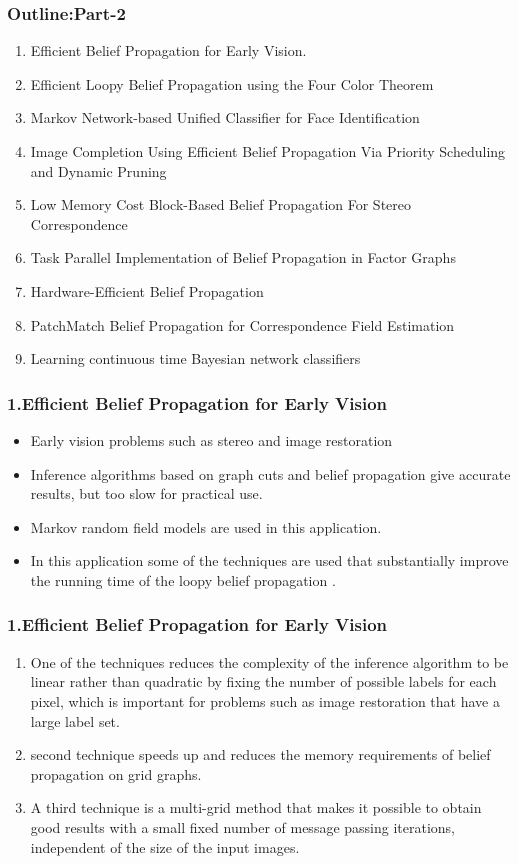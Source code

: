 \documentclass{beamer}
\begin{document}
\begin{frame}
\frametitle{\textbf{Outline:Part-2}}
\begin{enumerate}
\item Efficient Belief Propagation for Early Vision.
\item Efficient Loopy Belief Propagation using the Four Color Theorem
\item Markov Network-based Unified Classifier for Face Identification
\item Image Completion Using Efficient Belief Propagation Via Priority Scheduling and Dynamic Pruning
\item Low Memory Cost Block-Based Belief Propagation For Stereo Correspondence
\item Task Parallel Implementation of Belief Propagation in Factor Graphs
\item Hardware-Efficient Belief Propagation
\item PatchMatch Belief Propagation for Correspondence Field Estimation
\item Learning continuous time Bayesian network classifiers
\end{enumerate}
\end{frame}



\begin{frame}
\frametitle{\textbf{1.Efficient Belief Propagation for Early Vision}}
\begin{itemize}
\item Early vision problems such as stereo and image restoration
\item Inference algorithms based on graph cuts and belief propagation give accurate results, but  too slow for practical use.
\item Markov random field models are used in this application.
\item In this application  some of the techniques  are used that substantially improve the running time of the loopy belief propagation .

\end{itemize}
\end{frame}

\begin{frame}
\frametitle{\textbf{1.Efficient Belief Propagation for Early Vision}}

\begin{enumerate}
  \item One of the techniques reduces the complexity of the inference algorithm to be linear rather than quadratic by fixing the number of possible labels for each pixel, which is important for problems such as image restoration that have a large label set.
  \item second  technique speeds up and reduces the memory requirements of belief propagation on grid graphs.
  \item  A third technique is a multi-grid method that makes it possible to obtain good results with a small fixed number of message passing iterations, independent of the size of the input images.
\end{enumerate}

\end{frame}
\end{document}
